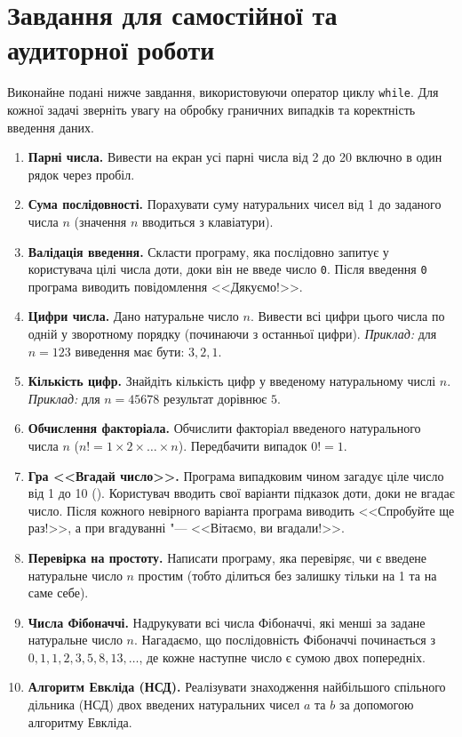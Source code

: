 \documentclass{scrreprt}
\begin{document}
	{\large
		\section*{Завдання для самостійної та аудиторної роботи}
		
		Виконайне подані нижче завдання, використовуючи оператор циклу \texttt{while}. Для кожної задачі зверніть увагу на обробку граничних випадків та коректність введення даних.
		
		\begin{enumerate}
			\item \textbf{Парні числа.} Вивести на екран усі парні числа від 2 до 20 включно в один рядок через пробіл.
			
			\item \textbf{Сума послідовності.} Порахувати суму натуральних чисел від 1 до заданого числа $n$ (значення $n$ вводиться з клавіатури).
			
			\item \textbf{Валідація введення.} Скласти програму, яка послідовно запитує у користувача цілі числа доти, доки він не введе число \texttt{0}. Після введення \texttt{0} програма виводить повідомлення <<Дякуємо!>>.
			
			\item \textbf{Цифри числа.} Дано натуральне число $n$. Вивести всі цифри цього числа по одній у зворотному порядку (починаючи з останньої цифри).  
			\textit{Приклад:} для $n = 123$ виведення має бути: $3, 2, 1$.
			
			\item \textbf{Кількість цифр.} Знайдіть кількість цифр у введеному натуральному числі $n$.  
			\textit{Приклад:} для $n = 45678$ результат дорівнює $5$.
			
			\item \textbf{Обчислення факторіала.} Обчислити факторіал введеного натурального числа $n$ ($n! = 1 \times 2 \times \dots \times n$). Передбачити випадок $0! = 1$.
			
			\item \textbf{Гра <<Вгадай число>>.} Програма випадковим чином загадує ціле число від 1 до 10 (). Користувач вводить свої варіанти підказок доти, доки не вгадає число. Після кожного невірного варіанта програма виводить <<Спробуйте ще раз!>>, а при вгадуванні "--- <<Вітаємо, ви вгадали!>>.
			
			\item \textbf{Перевірка на простоту.} Написати програму, яка перевіряє, чи є введене натуральне число $n$ простим (тобто ділиться без залишку тільки на 1 та на саме себе).
			
			\item \textbf{Числа Фібоначчі.} Надрукувати всі числа Фібоначчі, які менші за задане натуральне число $n$. Нагадаємо, що послідовність Фібоначчі починається з $0, 1, 1, 2, 3, 5, 8, 13, \dots$, де кожне наступне число є сумою двох попередніх.
			
			\item \textbf{Алгоритм Евкліда (НСД).} Реалізувати знаходження найбільшого спільного дільника (НСД) двох введених натуральних чисел $a$ та $b$ за допомогою алгоритму Евкліда.
		\end{enumerate}
	}
	
\end{document}
